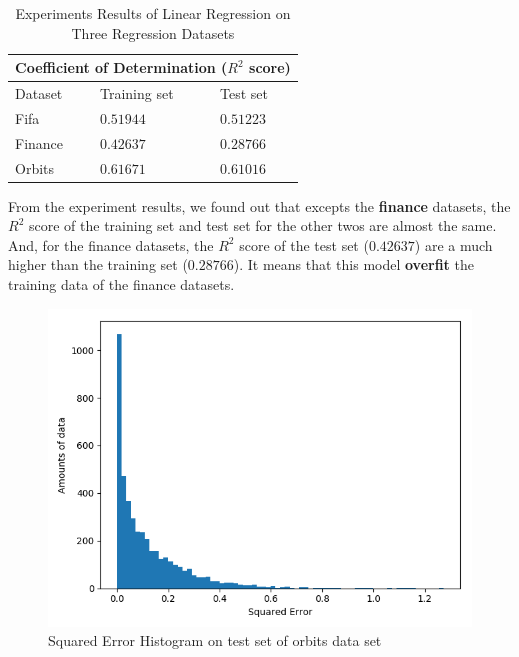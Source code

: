 \documentclass{article}
\begin{document}
\begin{table}[htb]
	\caption{Experiments Results of Linear Regression on Three Regression Datasets}
	\label{sample-table}
	\centering
	\begin{tabular}{lll}
		\toprule
		\cmidrule{1-3}
		\multicolumn{3}{c}{Coefficient of Determination ($R^2$ score)}\\
		\midrule
		Dataset & Training set & Test set \\
		\midrule
		Fifa & $0.51944$ & $0.51223$  \\
		Finance & $0.42637$  & $0.28766$ \\
		Orbits & $0.61671$  & $0.61016$  \\
		\bottomrule
	\end{tabular}
\end{table}

From the experiment results, we found out that excepts the \textbf{finance} datasets, the $R^2$ score of the training set and test set for the other twos are almost the same. And, for the finance datasets, the $R^2$ score of the test set ($0.42637$) are a much higher than the training set ($0.28766$). It means that this model  \textbf{overfit} the training data of the finance datasets.

\pagebreak

\begin{figure}[h]
  \centering
  \includegraphics[scale=0.3]{fifa_lg.png}
  \caption{Squared Error Histogram on test set of orbits data set}
\end{figure}
\end{document}
